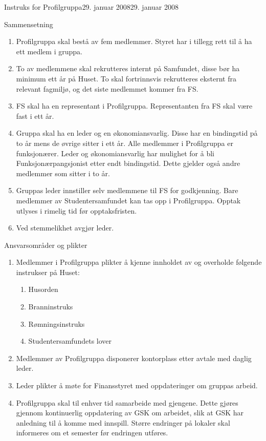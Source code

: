 \begin{instruks}{Instruks for Profilgruppa}{29. januar 2008}{29. januar 2008}
    \begin{instruksledd}{Sammensetning}
        \begin{enumerate}
            \item Profilgruppa skal bestå av fem medlemmer. Styret har i tillegg rett til å ha ett medlem i gruppa.
            \item To av medlemmene skal rekrutteres internt på Samfundet, disse bør ha minimum ett år på Huset. To skal
fortrinnsvis rekrutteres eksternt fra relevant fagmiljø, og det siste medlemmet kommer fra FS.
            \item  FS skal ha en representant i Profilgruppa. Representanten fra FS skal være fast i ett år.
            \item Gruppa skal ha en leder og en økonomiansvarlig. Disse har en bindingstid på to år mens de øvrige sitter i ett
år. Alle medlemmer i Profilgruppa er funksjonærer. Leder og økonomiansvarlig har mulighet for å bli
Funksjonærpangsjonist etter endt bindingstid. Dette gjelder også andre medlemmer som sitter i to år.
            \item Gruppas leder innstiller selv medlemmene til FS for godkjenning. Bare medlemmer av Studentersamfundet
kan tas opp i Profilgruppa. Opptak utlyses i rimelig tid før opptaksfristen.
            \item Ved stemmelikhet avgjør leder.
        \end{enumerate}
    \end{instruksledd}

    \begin{instruksledd}{Ansvarsområder og plikter}
        \begin{enumerate}
            \item Medlemmer i Profilgruppa plikter å kjenne innholdet av og overholde følgende instrukser på Huset:
                \begin{enumerate}
                    \item Husorden
                    \item Branninstruks
                    \item Rømningsinstruks
                    \item Studentersamfundets lover
                \end{enumerate}
            \item Medlemmer av Profilgruppa disponerer kontorplass etter avtale med daglig leder.
            \item Leder plikter å møte for Finansstyret med oppdateringer om gruppas arbeid.
            \item Profilgruppa skal til enhver tid samarbeide med gjengene. Dette gjøres gjennom kontinuerlig oppdatering av
GSK om arbeidet, slik at GSK har anledning til å komme med innspill. Større endringer på lokaler skal
informeres om et semester før endringen utføres.
        \end{enumerate}
    \end{instruksledd}


\end{instruks}
